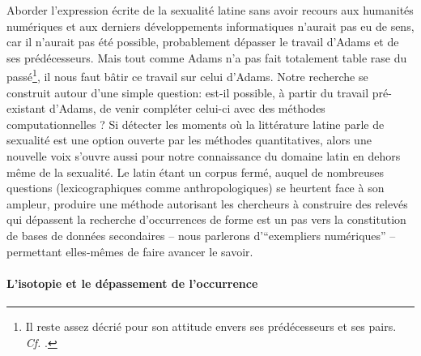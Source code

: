 
Aborder l'expression écrite de la sexualité latine sans avoir recours aux humanités numériques et aux derniers développements informatiques n'aurait pas eu de sens, car il n'aurait pas été possible, probablement dépasser le travail d'Adams et de ses prédécesseurs. Mais tout comme Adams n'a pas fait totalement table rase du passé\footnote{Il reste assez décrié pour son attitude envers ses prédécesseurs et ses pairs. \textit{Cf.} \textcite{richlin_sexual_1978}.}, il nous faut bâtir ce travail sur celui d'Adams. Notre recherche se construit autour d'une simple question: est-il possible, à partir du travail pré-existant d'Adams, de venir compléter celui-ci avec des méthodes computationnelles ? Si détecter les moments où la littérature latine parle de sexualité est une option ouverte par les méthodes quantitatives, alors une nouvelle voix s'ouvre aussi pour notre connaissance du domaine latin en dehors même de la sexualité. Le latin étant un corpus fermé, auquel de nombreuses questions (lexicographiques comme anthropologiques) se heurtent face à son ampleur, produire une méthode autorisant les chercheurs à construire des relevés qui dépassent la recherche d'occurrences de forme est un pas vers la constitution de bases de données secondaires -- nous parlerons d'\enquote{exempliers numériques} -- permettant elles-mêmes de faire avancer le savoir.


\paragraph{L'isotopie et le dépassement de l'occurrence}

